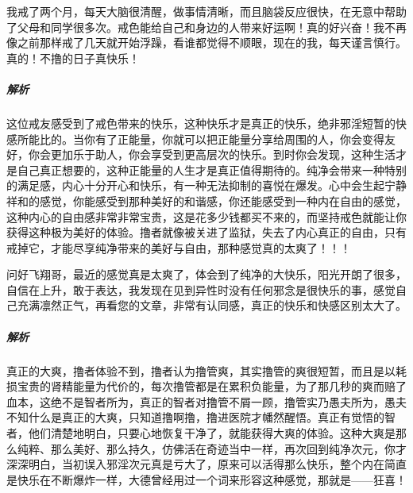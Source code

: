\begin{case}
    我戒了两个月，每天大脑很清醒，做事情清晰，而且脑袋反应很快，在无意中帮助了父母和同学很多次。戒色能给自己和身边的人带来好运啊！真的好兴奋！我不再像之前那样戒了几天就开始浮躁，看谁都觉得不顺眼，现在的我，每天谨言慎行。真的！不撸的日子真快乐！
    \subparagraph{解析} 这位戒友感受到了戒色带来的快乐，这种快乐才是真正的快乐，绝非邪淫短暂的快感所能比的。当你有了正能量，你就可以把正能量分享给周围的人，你会变得友好，你会更加乐于助人，你会享受到更高层次的快乐。到时你会发现，这种生活才是自己真正想要的，这种正能量的人生才是真正值得期待的。纯净会带来一种特别的满足感，内心十分开心和快乐，有一种无法抑制的喜悦在爆发。心中会生起宁静祥和的感觉，你能感受到那种美好的和谐感，你还能感受到一种内在自由的感觉，这种内心的自由感非常非常宝贵，这是花多少钱都买不来的，而坚持戒色就能让你获得这种极为美好的体验。撸者就像被关进了监狱，失去了内心真正的自由，只有戒掉它，才能尽享纯净带来的美好与自由，那种感觉真的太爽了！！！
\end{case}

\begin{case}
    问好飞翔哥，最近的感觉真是太爽了，体会到了纯净的大快乐，阳光开朗了很多，自信在上升，敢于表达，我发现在见到异性时没有任何邪念是很快乐的事，感觉自己充满凛然正气，再看您的文章，非常有认同感，真正的快乐和快感区别太大了。
    \subparagraph{解析} 真正的大爽，撸者体验不到，撸者认为撸管爽，其实撸管的爽很短暂，而且是以耗损宝贵的肾精能量为代价的，每次撸管都是在累积负能量，为了那几秒的爽而赔了血本，这绝不是智者所为，真正的智者对撸管不屑一顾，撸管实乃愚夫所为，愚夫不知什么是真正的大爽，只知道撸啊撸，撸进医院才幡然醒悟。真正有觉悟的智者，他们清楚地明白，只要心地恢复干净了，就能获得大爽的体验。这种大爽是那么纯粹、那么美好、那么持久，仿佛活在奇迹当中一样，再次回到纯净次元，你才深深明白，当初误入邪淫次元真是亏大了，原来可以活得那么快乐，整个内在简直是快乐在不断爆炸一样，大德曾经用过一个词来形容这种感觉，那就是——狂喜！
\end{case}

